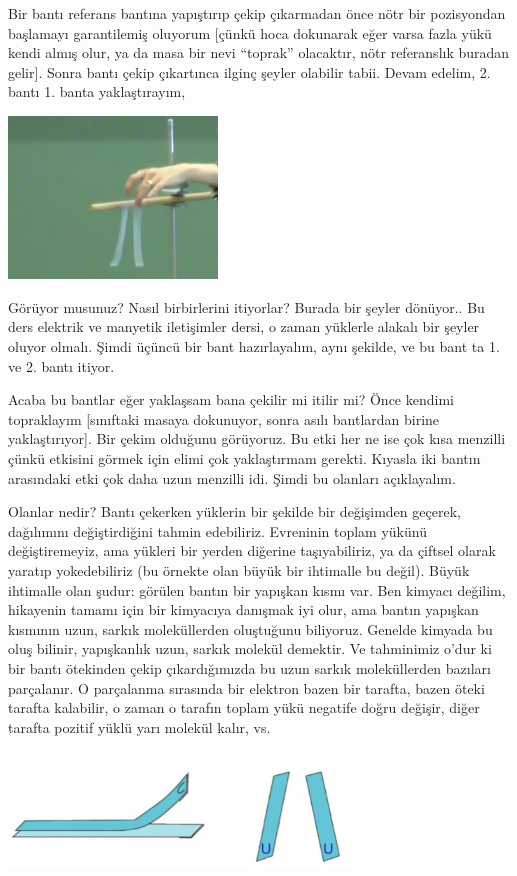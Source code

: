 \documentclass[12pt,fleqn]{article}\usepackage{../../common}
\begin{document}
Bir bantı referans bantına yapıştırıp çekip çıkarmadan önce nötr bir pozisyondan
başlamayı garantilemiş oluyorum [çünkü hoca dokunarak eğer varsa fazla yükü
 kendi almış olur, ya da masa bir nevi ``toprak'' olacaktır, nötr referanslık
 buradan gelir]. Sonra bantı çekip çıkartınca ilginç şeyler olabilir
tabii. Devam edelim, 2. bantı 1. banta yaklaştırayım,

\includegraphics[width=15em]{03_06.png}

Görüyor musunuz? Nasıl birbirlerini itiyorlar?  Burada bir şeyler dönüyor.. Bu
ders elektrik ve manyetik iletişimler dersi, o zaman yüklerle alakalı bir şeyler
oluyor olmalı. Şimdi üçüncü bir bant hazırlayalım, aynı şekilde, ve bu bant ta
1. ve 2. bantı itiyor.

Acaba bu bantlar eğer yaklaşsam bana çekilir mi itilir mi? Önce kendimi
topraklayım [sınıftaki masaya dokunuyor, sonra asılı bantlardan birine
yaklaştırıyor]. Bir çekim olduğunu görüyoruz. Bu etki her ne ise çok kısa
menzilli çünkü etkisini görmek için elimi çok yaklaştırmam gerekti. Kıyasla
iki bantın arasındaki etki çok daha uzun menzilli idi. Şimdi bu olanları
açıklayalım.

Olanlar nedir? Bantı çekerken yüklerin bir şekilde bir değişimden geçerek,
dağılımını değiştirdiğini tahmin edebiliriz. Evreninin toplam yükünü
değiştiremeyiz, ama yükleri bir yerden diğerine taşıyabiliriz, ya da çiftsel
olarak yaratıp yokedebiliriz (bu örnekte olan büyük bir ihtimalle bu
değil). Büyük ihtimalle olan şudur: görülen bantın bir yapışkan kısmı var. Ben
kimyacı değilim, hikayenin tamamı için bir kimyacıya danışmak iyi olur, ama
bantın yapışkan kısmının uzun, sarkık moleküllerden oluştuğunu
biliyoruz. Genelde kimyada bu oluş bilinir, yapışkanlık uzun, sarkık molekül
demektir. Ve tahminimiz o'dur ki bir bantı ötekinden çekip çıkardığımızda bu
uzun sarkık moleküllerden bazıları parçalanır. O parçalanma sırasında bir
elektron bazen bir tarafta, bazen öteki tarafta kalabilir, o zaman o tarafın
toplam yükü negatife doğru değişir, diğer tarafta pozitif yüklü yarı molekül
kalır, vs.

\includegraphics[width=25em]{03_07.png}
\end{document}
